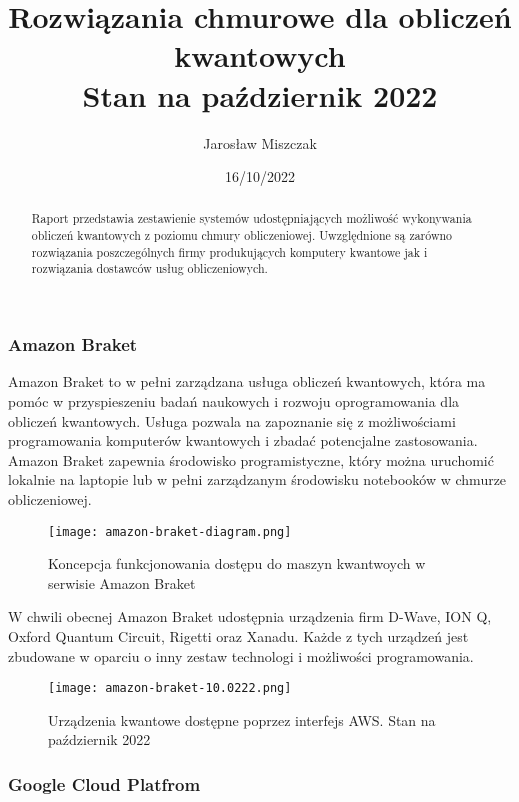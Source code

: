 \documentclass[a4paper,12pt
]{article}
\begin{document}
\title{Rozwiązania chmurowe dla obliczeń
kwantowych\\ {\normalsize Stan na październik
2022}}

\author{Jarosław Miszczak}
\date{16/10/2022}

\maketitle

\begin{abstract}
Raport przedstawia zestawienie systemów udostępniających możliwość
wykonywania obliczeń kwantowych z poziomu chmury obliczeniowej.
Uwzględnione są zarówno rozwiązania poszczególnych firmy produkujących komputery
kwantowe jak i rozwiązania dostawców usług obliczeniowych.
\end{abstract}



\hypertarget{amazon-braket}{%
\subsubsection{Amazon Braket}\label{amazon-braket}}

Amazon Braket to w pełni zarządzana usługa obliczeń kwantowych, która ma
pomóc w przyspieszeniu badań naukowych i rozwoju oprogramowania dla
obliczeń kwantowych. Usługa pozwala na zapoznanie się z możliwościami
programowania komputerów kwantowych i zbadać potencjalne zastosowania.
Amazon Braket zapewnia środowisko programistyczne, który można uruchomić
lokalnie na laptopie lub w pełni zarządzanym środowisku notebooków w
chmurze obliczeniowej.

\begin{figure}
\centering
\texttt{[image: amazon-braket-diagram.png]}
\caption{Koncepcja funkcjonowania dostępu do maszyn kwantwoych w
serwisie Amazon Braket}
\end{figure}

W chwili obecnej Amazon Braket udostępnia urządzenia firm D-Wave, ION Q,
Oxford Quantum Circuit, Rigetti oraz Xanadu. Każde z tych urządzeń jest
zbudowane w oparciu o inny zestaw technologi i możliwości programowania.

\begin{figure}
\centering
\texttt{[image: amazon-braket-10.0222.png]}
\caption{Urządzenia kwantowe dostępne poprzez interfejs AWS. Stan na
październik 2022}
\end{figure}

\hypertarget{google-cloud-platfrom}{%
\subsubsection{Google Cloud Platfrom}\label{google-cloud-platfrom}}
\end{document}
